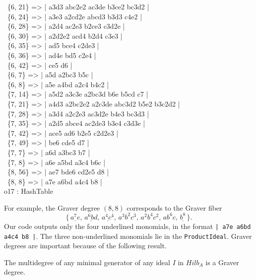 \                \{6, 21\} => | a3d3 abc2e2 ac3de b3ce2 bc3d2 |\\
\                \{6, 24\} => | a3e3 a2cd2e abcd3 b3d3 c4e2 |\\
\                \{6, 28\} => | a2d4 ac2e3 b2ce3 c3d2e |\\
\                \{6, 30\} => | a2d2e2 acd4 b2d4 c3e3 |\\
\                \{6, 35\} => | ad5 bce4 c2de3 |\\
\                \{6, 36\} => | ad4e bd5 c2e4 |\\
\                \{6, 42\} => | ce5 d6 |\\
\                \{6, 7\} => | a5d a2bc3 b5c |\\
\                \{6, 8\} => | a5e a4bd a2c4 b4c2 |\\
\                \{7, 14\} => | a5d2 a3c3e a2bc3d b6e b5cd c7 |\\
\                \{7, 21\} => | a4d3 a2bc2e2 a2c3de abc3d2 b5e2 b3c2d2 |\\
\                \{7, 28\} => | a3d4 a2c2e3 ac3d2e b4e3 bc3d3 |\\
\                \{7, 35\} => | a2d5 abce4 ac2de3 b3e4 c3d3e |\\
\                \{7, 42\} => | ace5 ad6 b2e5 c2d2e3 |\\
\                \{7, 49\} => | be6 cde5 d7 |\\
\                \{7, 7\} => | a6d a3bc3 b7 |\\
\                \{7, 8\} => | a6e a5bd a3c4 b6c |\\
\                \{8, 56\} => | ae7 bde6 cd2e5 d8 |\\
\                \{8, 8\} => | a7e a6bd a4c4 b8 |\\
\emptyLine
o17 : HashTable\\
\endOutput

For example, the Graver degree $(8,8)$ corresponds to the Graver fiber
$$ \bigl\{\,
\underline{a^7 e}, \, \underline{a^6 b d},\,  \underline{a^4 c^4}, \,
a^3 b^2 c^3,\, a^2 b^4 c^2,\,  a b^6 c, \, \underline{b^8} \,\bigr\}.$$
Our \Mtwo code outputs only the four underlined monomials,
in the format {\tt  | a7e a6bd a4c4 b8 |}. The three non-underlined 
monomials lie in the {\tt ProductIdeal}. Graver degrees are
important because of the following result.

\begin{lemma}[{\cite[Lemma 10.5]{HS:St2}}]
The multidegree of any minimal generator of any ideal 
$I$ in $Hilb_A$ is a Graver degree.
\end{lemma}

